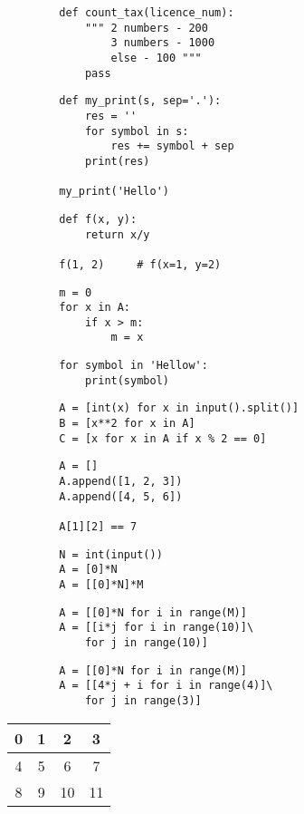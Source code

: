 \documentclass[a4paper, fleqn]{article}
\begin{document}
	
	\begin{lstlisting}
		def count_tax(licence_num):	
			""" 2 numbers - 200
				3 numbers - 1000
				else - 100 """	
			pass
	\end{lstlisting}
	
	\begin{lstlisting}
		def my_print(s, sep='.'):
			res = ''
			for symbol in s:
				res += symbol + sep
			print(res)
			
		my_print('Hello')
	\end{lstlisting}
	
	\begin{lstlisting}
		def f(x, y):
			return x/y
			
		f(1, 2)		# f(x=1, y=2)
	\end{lstlisting}
	
	\begin{lstlisting}
		m = 0
		for x in A:
			if x > m:
				m = x
	\end{lstlisting}
	
	\begin{lstlisting}
		for symbol in 'Hellow':
			print(symbol)
	\end{lstlisting}
	
	\begin{lstlisting}
		A = [int(x) for x in input().split()]
		B = [x**2 for x in A]
		C = [x for x in A if x % 2 == 0]
	\end{lstlisting}
	
	\begin{lstlisting}
		A = []
		A.append([1, 2, 3])
		A.append([4, 5, 6])
		
		A[1][2] == 7
	\end{lstlisting}
	
	\begin{lstlisting}
		N = int(input())
		A = [0]*N
		A = [[0]*N]*M
	\end{lstlisting}
	
	\begin{lstlisting}
		A = [[0]*N for i in range(M)]
		A = [[i*j for i in range(10)]\
			for j in range(10)]
	\end{lstlisting}
	
	\begin{lstlisting}
		A = [[0]*N for i in range(M)]
		A = [[4*j + i for i in range(4)]\
			for j in range(3)]
	\end{lstlisting}
	
	\begin{tabular}{|c|c|c|c|}
		\hline \rule[-2ex]{0pt}{5.5ex}  0&  1&  2&  3\\ 
		\hline \rule[-2ex]{0pt}{5.5ex}  4&  5&  6&  7\\ 
		\hline \rule[-2ex]{0pt}{5.5ex}  8&  9&  10&  11\\ 
		\hline 
	\end{tabular}
	
\end{document}
